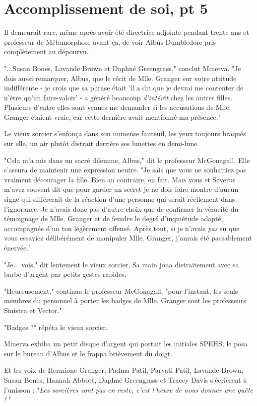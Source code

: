 
\chapter{Accomplissement de soi, pt 5}

Il demeurait rare, même après avoir été directrice adjointe pendant trente ans et professeur de Métamorphose avant ça, de voir Albus Dumbledore pris complètement au dépourvu.

"...Susan Bones, Lavande Brown et Daphné Greengrass," conclut Minerva. "Je dois aussi remarquer, Albus, que le récit de Mlle. Granger sur votre attitude indifférente - je crois que sa phrase était 'il a dit que je devrai me contenter de n'être qu'un faire-valoir' - a généré beaucoup \emph{d'intérêt}  chez les autres filles. Plusieurs d'entre elles sont venues me demander si les accusations de Mlle. Granger étaient vraie, car cette dernière avait mentionné ma présence."

Le vieux sorcier s'enfonça dans son immense fauteuil, les yeux toujours braqués sur elle, un air plutôt distrait derrière ses lunettes en demi-lune.

"Cela m'a mis dans un sacré dilemme, Albus," dit le professeur McGonagall. Elle s'assura de maintenir une expression neutre. "Je sais que vous ne souhaitiez pas vraiment décourager la fille. Bien au contraire, en fait. Mais vous et Severus m'avez souvent dit que pour garder un secret je ne dois faire montre d'aucun signe qui différerait de la réaction d'une personne qui serait réellement dans l'ignorance. Je n'avais donc pas d'autre choix que de confirmer la véracité du témoignage de Mlle. Granger et de feindre le degré d'inquiétude adapté, accompagnée d'un ton légèrement offensé. Après tout, si je n'avais \emph{pas}  su que vous essayiez délibérément de manipuler Mlle. Granger, j'aurais été passablement énervée."

"Je... vois," dit lentement le vieux sorcier. Sa main joua distraitement avec sa barbe d'argent par petits gestes rapides.

"Heureusement," continua le professeur McGonagall, "pour l'instant, les seuls membres du personnel à porter les badges de Mlle. Granger sont les professeurs Sinistra et Vector."

"Badges ?" répéta le vieux sorcier.

Minerva exhiba un petit disque d'argent qui portait les initiales SPEHS, le posa sur le bureau d'Albus et le frappa brièvement du doigt.

Et les voix de Hermione Granger, Padma Patil, Parvati Patil, Lavande Brown, Susan Bones, Hannah Abbott, Daphné Greengrass et Tracey Davis s'écrièrent à l'unisson : "\emph{Les sorcières sont pas en reste, c'est l'heure de nous donner une quête !} "

